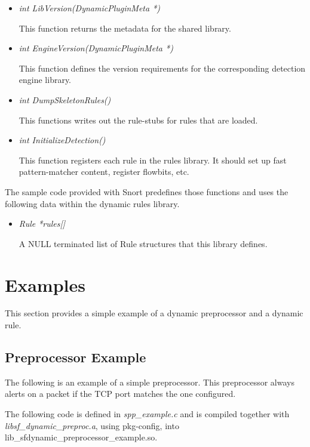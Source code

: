 \documentclass[english]{report}
\begin{document}
\begin{itemize}
\item {\em int LibVersion(DynamicPluginMeta *)}

This function returns the metadata for the shared library.

\item {\em int EngineVersion(DynamicPluginMeta *)}

This function defines the version requirements for the corresponding detection
engine library.

\item {\em int DumpSkeletonRules()}

This functions writes out the rule-stubs for rules that are loaded.

\item {\em int InitializeDetection()}

This function registers each rule in the rules library.  It should set up fast
pattern-matcher content, register flowbits, etc.  \end{itemize}

The sample code provided with Snort predefines those functions and uses the
following data within the dynamic rules library.

\begin{itemize}

\item {\em Rule *rules[]}

A NULL terminated list of Rule structures that this library defines.

\end{itemize}

\section{Examples}

This section provides a simple example of a dynamic preprocessor and a dynamic
rule.

\subsection{Preprocessor Example}

The following is an example of a simple preprocessor.  This preprocessor always
alerts on a packet if the TCP port matches the one configured.

The following code is defined in {\em spp\_example.c} and is compiled
together with {\em libsf\_dynamic\_preproc.a}, using pkg-config, into
lib\_sfdynamic\_preprocessor\_example.so.
\end{document}
